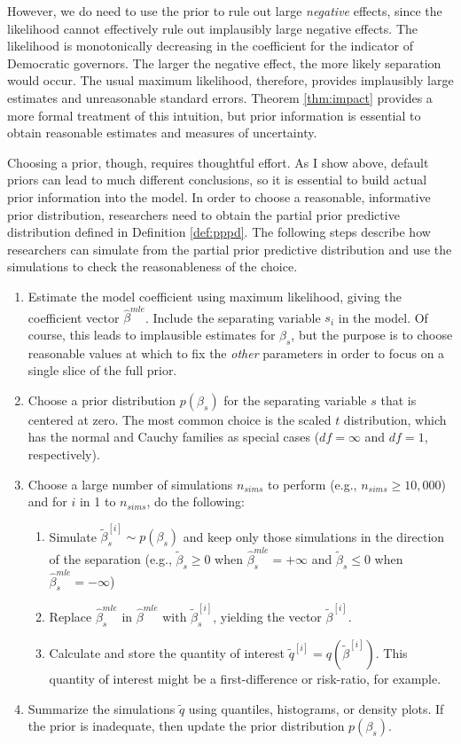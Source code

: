 \documentclass[12pt]{article}
\begin{document}
However, we do need to use the prior to rule out large \textit{negative} effects, since the likelihood cannot effectively rule out implausibly large negative effects. The likelihood is monotonically decreasing in the coefficient for the indicator of Democratic governors. The larger the negative effect, the more likely separation would occur. The usual maximum likelihood, therefore, provides implausibly large estimates and unreasonable standard errors. Theorem \ref{thm:impact} provides a more formal treatment of this intuition, but prior information is essential to obtain reasonable estimates and measures of uncertainty. 

Choosing a prior, though, requires thoughtful effort. As I show above, default priors can lead to much different conclusions, so it is essential to build actual prior information into the model. In order to choose a reasonable, informative prior distribution, researchers need to obtain the partial prior predictive distribution defined in Definition \ref{def:pppd}. The following steps describe how researchers can simulate from the partial prior predictive distribution and use the simulations to check the reasonableness of the choice.
\begin{enumerate}
\item Estimate the model coefficient using maximum likelihood, giving the coefficient vector $\hat{\beta}^{mle}$. Include the separating variable $s_i$ in the model. Of course, this leads to implausible estimates for $\beta_s$, but the purpose is to choose reasonable values at which to fix the \emph{other} parameters in order to focus on a single slice of the full prior. 
\item Choose a prior distribution $p(\beta_s)$ for the separating variable $s$ that is centered at zero. The most common choice is the scaled $t$ distribution, which has the normal and Cauchy families as special cases ($df = \infty$ and $df = 1$, respectively). 
\item Choose a large number of simulations $n_{sims}$ to perform (e.g., $n_{sims} \geq 10,000$) and for $i$ in 1 to $n_{sims}$, do the following:
	\begin{enumerate}
	\item Simulate $\tilde{\beta}^{[i]}_s \sim p(\beta_s)$ and keep only those simulations in the direction of the separation (e.g., $\tilde{\beta}_s \geq 0$ when $\hat{\beta}_{s}^{mle} = +\infty$ and $\tilde{\beta}_s \leq 0$ when $\hat{\beta}_{s}^{mle} = -\infty$)
	\item Replace $\hat{\beta}_s^{mle}$ in $\hat{\beta}^{mle}$ with $\tilde{\beta}^{[i]}_s$, yielding the vector $\tilde{\beta}^{[i]}$.
	\item Calculate and store the quantity of interest $\tilde{q}^{[i]} = q\left(\tilde{\beta}^{[i]}\right)$. This quantity of interest might be a first-difference or risk-ratio, for example.
	\end{enumerate}
\item Summarize the simulations $\tilde{q}$ using quantiles, histograms, or density plots. If the prior is inadequate, then update the prior distribution $p(\beta_s)$.
\end{enumerate}
\end{document}
